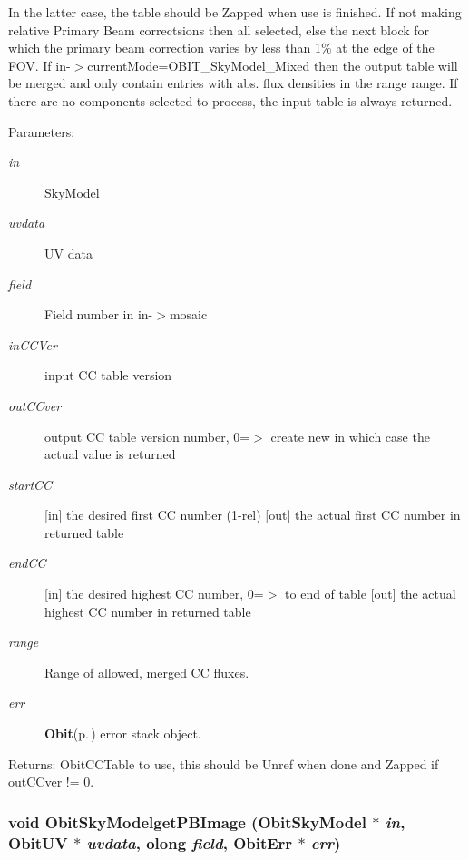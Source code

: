 In the latter case, the table should be Zapped when use is finished. If not making relative Primary Beam correctsions then all selected, else the next block for which the primary beam correction varies by less than 1\% at the edge of the FOV. If in-$>$current\-Mode=OBIT\_\-Sky\-Model\_\-Mixed then the output table will be merged and only contain entries with abs. flux densities in the range range. If there are no components selected to process, the input table is always returned. \begin{Desc}
\item[Parameters:]
\begin{description}
\item[{\em in}]Sky\-Model \item[{\em uvdata}]UV data \item[{\em field}]Field number in in-$>$mosaic \item[{\em in\-CCVer}]input CC table version \item[{\em out\-CCver}]output CC table version number, 0=$>$ create new in which case the actual value is returned \item[{\em start\-CC}][in] the desired first CC number (1-rel) [out] the actual first CC number in returned table \item[{\em end\-CC}][in] the desired highest CC number, 0=$>$ to end of table [out] the actual highest CC number in returned table \item[{\em range}]Range of allowed, merged CC fluxes. \item[{\em err}]{\bf Obit}{\rm (p.\,\pageref{structObit})} error stack object. \end{description}
\end{Desc}
\begin{Desc}
\item[Returns:]Obit\-CCTable to use, this should be Unref when done and Zapped if out\-CCver != 0. \end{Desc}
\subsubsection{\setlength{\rightskip}{0pt plus 5cm}void Obit\-Sky\-Modelget\-PBImage ({\bf Obit\-Sky\-Model} $\ast$ {\em in}, {\bf Obit\-UV} $\ast$ {\em uvdata}, {\bf olong} {\em field}, {\bf Obit\-Err} $\ast$ {\em err})}\label{ObitSkyModel_8c_a37}


